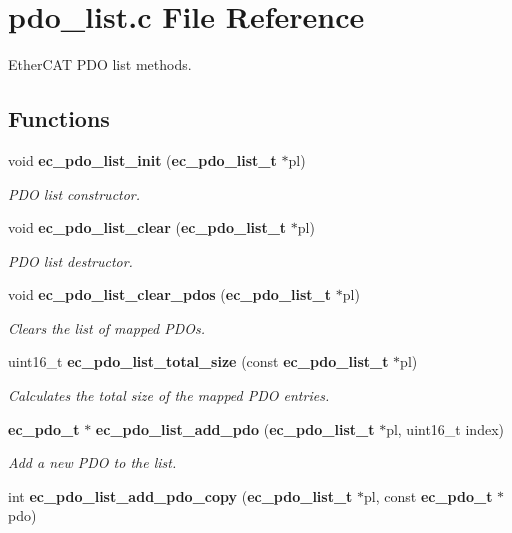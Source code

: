 \section{pdo\-\_\-list.\-c File Reference}
\label{pdo__list_8c}


Ether\-C\-A\-T P\-D\-O list methods.  


\subsection*{Functions}
\begin{DoxyCompactItemize}
\item 
void {\bf ec\-\_\-pdo\-\_\-list\-\_\-init} ({\bf ec\-\_\-pdo\-\_\-list\-\_\-t} $\ast$pl)
\begin{DoxyCompactList}\small\item\em P\-D\-O list constructor. \end{DoxyCompactList}\item 
void {\bf ec\-\_\-pdo\-\_\-list\-\_\-clear} ({\bf ec\-\_\-pdo\-\_\-list\-\_\-t} $\ast$pl)
\begin{DoxyCompactList}\small\item\em P\-D\-O list destructor. \end{DoxyCompactList}\item 
void {\bf ec\-\_\-pdo\-\_\-list\-\_\-clear\-\_\-pdos} ({\bf ec\-\_\-pdo\-\_\-list\-\_\-t} $\ast$pl)
\begin{DoxyCompactList}\small\item\em Clears the list of mapped P\-D\-Os. \end{DoxyCompactList}\item 
uint16\-\_\-t {\bf ec\-\_\-pdo\-\_\-list\-\_\-total\-\_\-size} (const {\bf ec\-\_\-pdo\-\_\-list\-\_\-t} $\ast$pl)
\begin{DoxyCompactList}\small\item\em Calculates the total size of the mapped P\-D\-O entries. \end{DoxyCompactList}\item 
{\bf ec\-\_\-pdo\-\_\-t} $\ast$ {\bf ec\-\_\-pdo\-\_\-list\-\_\-add\-\_\-pdo} ({\bf ec\-\_\-pdo\-\_\-list\-\_\-t} $\ast$pl, uint16\-\_\-t index)
\begin{DoxyCompactList}\small\item\em Add a new P\-D\-O to the list. \end{DoxyCompactList}\item 
int {\bf ec\-\_\-pdo\-\_\-list\-\_\-add\-\_\-pdo\-\_\-copy} ({\bf ec\-\_\-pdo\-\_\-list\-\_\-t} $\ast$pl, const {\bf ec\-\_\-pdo\-\_\-t} $\ast$pdo)

\end{DoxyCompactItemize}
